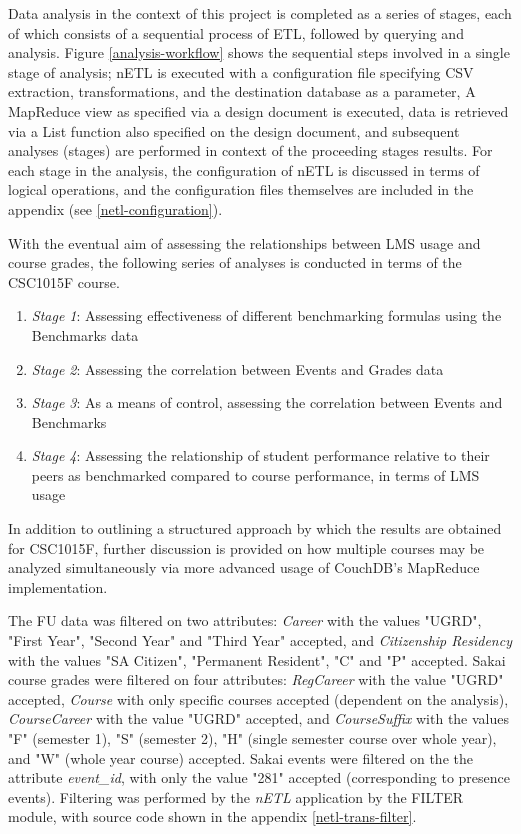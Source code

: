 Data analysis in the context of this project is completed as a series of stages, each of which consists of a sequential process of ETL, followed by querying and analysis. Figure \ref{analysis-workflow} shows the sequential steps involved in a single stage of analysis; nETL is executed with a configuration file specifying CSV extraction, transformations, and the destination database as a parameter, A MapReduce view as specified via a design document is executed, data is retrieved via a List function also specified on the design document, and subsequent analyses (stages) are performed in context of the proceeding stages results. For each stage in the analysis, the configuration of nETL is discussed in terms of logical operations, and the configuration files themselves are included in the appendix (see \ref{netl-configuration}).

With the eventual aim of assessing the relationships between LMS usage and course grades, the following series of analyses is conducted in terms of the CSC1015F course.

\begin{enumerate}
    \item \textit{Stage 1}: Assessing effectiveness of different benchmarking formulas using the Benchmarks data
    \item \textit{Stage 2}: Assessing the correlation between Events and Grades data
    \item \textit{Stage 3}: As a means of control, assessing the correlation between Events and Benchmarks
    \item \textit{Stage 4}: Assessing the relationship of student performance relative to their peers as benchmarked compared to course performance, in terms of LMS usage
\end{enumerate}

In addition to outlining a structured approach by which the results are obtained for CSC1015F, further discussion is provided on how multiple courses may be analyzed simultaneously via more advanced usage of CouchDB's MapReduce implementation.






The FU data was filtered on two attributes: \textit{Career} with the values "UGRD", "First Year", "Second Year" and "Third Year" accepted, and \textit{Citizenship Residency} with the values "SA Citizen", "Permanent Resident", "C" and "P" accepted. Sakai course grades were filtered on four attributes: \textit{RegCareer} with the value "UGRD" accepted, \textit{Course} with only specific courses accepted (dependent on the analysis), \textit{CourseCareer} with the value "UGRD" accepted, and \textit{CourseSuffix} with the values "F" (semester 1), "S" (semester 2), "H" (single semester course over whole year), and "W" (whole year course) accepted. Sakai events were filtered on the the attribute \textit{event\_id}, with only the value "281" accepted (corresponding to presence events). Filtering was performed by the \textit{nETL} application by the FILTER module, with source code shown in the appendix \ref{netl-trans-filter}.

